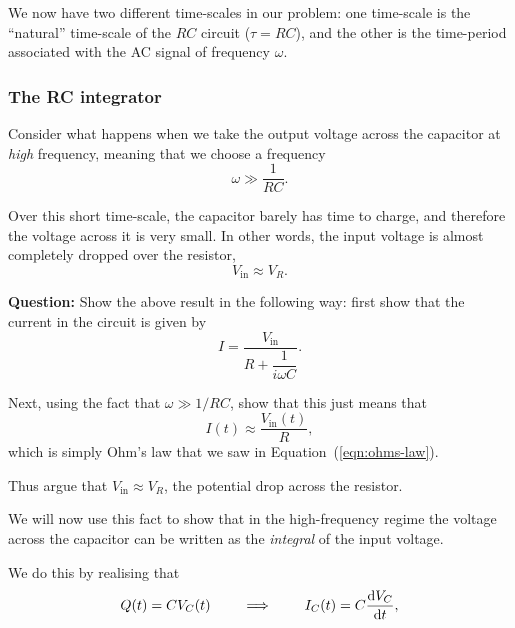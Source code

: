 We now have two different time-scales in our problem: one time-scale is the ``natural'' time-scale of the $RC$ circuit ($\tau = RC$), and the other is the time-period associated with the AC signal of frequency $\omega$. 

\subsubsection*{The RC integrator}

Consider what happens when we take the output voltage across the capacitor at \textsl{high} frequency, meaning that we choose a frequency 
\begin{equation}
    \omega \gg \frac{1}{RC}.
\end{equation}

Over this short time-scale, the capacitor barely has time to charge, and therefore the voltage across it is very small. In other words, the input voltage is almost completely dropped over the resistor,
\begin{equation}
    V_\text{in} \approx V_R.
\end{equation}

\begin{question}
    \textbf{Question:} Show the above result in the following way: first show that the current in the circuit is given by
    \begin{equation}
        I = \dfrac{V_\text{in}}{R + \dfrac{1}{i\omega C}}.
        \label{eqn:RC-current}
    \end{equation}

    Next, using the fact that $\omega \gg 1/RC$, show that this just means that 
    \begin{equation}
        I(t) \approx \frac{V_\text{in} (t)}{R},
        \label{eqn:high-freq-current}
    \end{equation}
    which is simply Ohm's law that we saw in Equation~(\ref{eqn:ohms-law}).

    Thus argue that $V_\text{in} \approx V_R$, the potential drop across the resistor.
\end{question}

We will now use this fact to show that in the high-frequency regime the voltage across the capacitor can be written as the \textsl{integral} of the input voltage.

We do this by realising that
\begin{equation}
    Q(t) = C V_C(t) \quad \quad \implies \quad \quad I_C(t) = C \dv{V_C}{t},
\end{equation}

